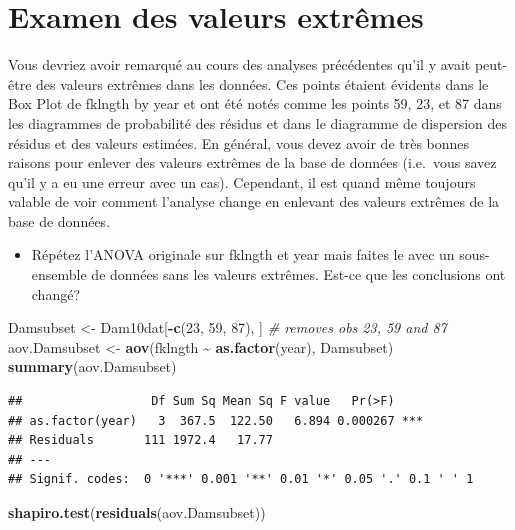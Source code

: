 \documentclass[
  12pt,
]{book}
\newenvironment{Shaded}{\begin{snugshade}}{\end{snugshade}}
\newcommand{\CommentTok}[1]{\textcolor[rgb]{0.56,0.35,0.01}{\textit{#1}}}
\newcommand{\DecValTok}[1]{\textcolor[rgb]{0.00,0.00,0.81}{#1}}
\newcommand{\KeywordTok}[1]{\textcolor[rgb]{0.13,0.29,0.53}{\textbf{#1}}}
\newcommand{\NormalTok}[1]{#1}
\newcommand{\OperatorTok}[1]{\textcolor[rgb]{0.81,0.36,0.00}{\textbf{#1}}}
\newcommand{\StringTok}[1]{\textcolor[rgb]{0.31,0.60,0.02}{#1}}
\providecommand{\tightlist}{%
  \setlength{\itemsep}{0pt}\setlength{\parskip}{0pt}}
\begin{document}
\hypertarget{examen-des-valeurs-extruxeames}{%
\section{Examen des valeurs extrêmes}\label{examen-des-valeurs-extruxeames}}

Vous devriez avoir remarqué au cours des analyses précédentes qu'il y avait peut-être des valeurs extrêmes dans les données. Ces points étaient évidents dans le Box Plot de fklngth by year et ont été notés comme les points 59, 23, et 87 dans les diagrammes de probabilité des résidus et dans le diagramme de dispersion des résidus et des valeurs estimées. En général, vous devez avoir de très bonnes raisons pour enlever des valeurs extrêmes de la base de données (i.e.~vous savez qu'il y a eu une erreur avec un cas). Cependant, il est quand même toujours valable de voir comment l'analyse change en enlevant des valeurs extrêmes de la base de données.

\begin{itemize}
\tightlist
\item
  Répétez l'ANOVA originale sur fklngth et year mais faites le avec un sous-ensemble de données sans les valeurs extrêmes. Est-ce que les conclusions ont changé?
\end{itemize}

\begin{Shaded}
\begin{Highlighting}[]
\NormalTok{Damsubset \textless{}{-}}\StringTok{ }\NormalTok{Dam10dat[}\OperatorTok{{-}}\KeywordTok{c}\NormalTok{(}\DecValTok{23}\NormalTok{, }\DecValTok{59}\NormalTok{, }\DecValTok{87}\NormalTok{), ] }\CommentTok{\# removes obs 23, 59 and 87}
\NormalTok{aov.Damsubset \textless{}{-}}\StringTok{ }\KeywordTok{aov}\NormalTok{(fklngth }\OperatorTok{\textasciitilde{}}\StringTok{ }\KeywordTok{as.factor}\NormalTok{(year), Damsubset)}
\KeywordTok{summary}\NormalTok{(aov.Damsubset)}
\end{Highlighting}
\end{Shaded}

\begin{verbatim}
##                  Df Sum Sq Mean Sq F value   Pr(>F)    
## as.factor(year)   3  367.5  122.50   6.894 0.000267 ***
## Residuals       111 1972.4   17.77                     
## ---
## Signif. codes:  0 '***' 0.001 '**' 0.01 '*' 0.05 '.' 0.1 ' ' 1
\end{verbatim}

\begin{Shaded}
\begin{Highlighting}[]
\KeywordTok{shapiro.test}\NormalTok{(}\KeywordTok{residuals}\NormalTok{(aov.Damsubset))}
\end{Highlighting}
\end{Shaded}
\end{document}
